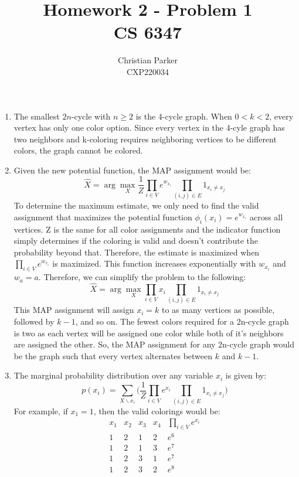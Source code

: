 \documentclass{article}
\title{Homework 2 - Problem 1 \\ CS 6347}
\author{Christian Parker \\ CXP220034}
\begin{document}
\maketitle

\begin{enumerate} %
    \item[1.] %
        The smallest \(2n\)-cycle with \(n \geq 2\) is the 4-cycle graph.
        When \(0 < k < 2\), every vertex has only one color option.
        Since every vertex in the 4-cyle graph has two neighbors and k-coloring
        requires neighboring vertices to be different colors, the graph cannot be colored.
    \item[2.] %
    Given the new potential function, the MAP assignment would be:
    \[
        \hat{X} = \arg\max_{X} \frac{1}{Z} \prod_{i \in V} e^{w_{x_i}} \prod_{(i,j) \in E} 1_{x_i \neq x_j}
    \]
    To determine the maximum estimate, we only need to find the valid assignment that maximizes
    the potential function \(\phi_i(x_i) = e^{w_{x_i}}\) across all vertices. Z is the same
    for all color assignments and the indicator function simply determines if the coloring
    is valid and doesn't contribute the probability beyond that. Therefore, the estimate is
    maximized when \(\prod_{i \in V} e^{w_{x_i}}\) is maximized. This function increases
    exponentially with \(w_{x_i}\) and \(w_a = a\). Therefore, we can simplify
    the problem to the following:
    \[
        \hat{X} = \arg\max_{X} \prod_{i \in V} x_i \prod_{(i,j) \in E} 1_{x_i \neq x_j}
    \]
    This MAP assignment will assign \(x_i = k\) to as many vertices as possible,
    followed by \(k-1\), and so on. The fewest colors required for a 2n-cycle graph
    is two as each vertex will be assigned one color while both of it's neighbors are
    assigned the other. So, the MAP assignment for any 2n-cycle graph would
    be the graph such that every vertex alternates between \(k\) and \(k-1\).

    \item[3.] %
    The marginal probability distribution over any variable \(x_i\) is given by:
    \[
        p(x_i) = \sum_{X \backslash x_i} \Bigg( \frac{1}{Z} \prod_{i \in V} e^{x_i} \prod_{(i,j) \in E} 1_{x_i \neq x_j} \Bigg)
    \]
    For example, if \(x_1 = 1\), then the valid colorings would be:
    \[
        \begin{array}{c|c|c|c|c}
            x_1 & x_2 & x_3 & x_4 & \prod_{i \in V} e^{x_i} \\
            \hline
            1 & 2 & 1 & 2 & e^6 \\
            1 & 2 & 1 & 3 & e^7 \\
            1 & 2 & 3 & 1 & e^7 \\
            1 & 2 & 3 & 2 & e^8 \\


\end{array}\]
\end{enumerate}
\end{document}
